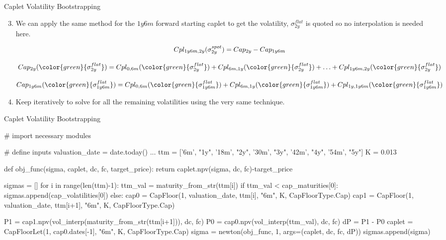 \documentclass{beamer}
\begin{document}
\begin{frame}{Caplet Volatility Bootstrapping}
\begin{enumerate}
\setcounter{enumi}{2}
\item We can apply the same method for the $1y6m$ forward starting caplet to get the volatility, $\sigma^{flat}_{2y}$ is quoted so no interpolation is needed here.

\begin{equation*}
	\begin{gathered}
		Cpl_{1y6m, 2y}(\sigma^{spot}_{2y})=Cap_{2y}-Cap_{1y6m} \\[0.3cm]
		Cap_{2y}(\color{green}{\sigma^{flat}_{2y}})=Cpl_{0,6m}(\color{green}{\sigma^{flat}_{2y}}) + Cpl_{6m,1y}(\color{green}{\sigma^{flat}_{2y}}) + \ldots + Cpl_{1y6m,2y}(\color{green}{\sigma^{flat}_{2y}}) \\[0.3cm]
		Cap_{1y6m}(\color{green}{\sigma^{flat}_{1y6m}})=Cpl_{0,6m}(\color{green}{\sigma^{flat}_{1y6m}}) + Cpl_{6m,1y}(\color{green}{\sigma^{flat}_{1y6m}}) + Cpl_{1y,1y6m}(\color{green}{\sigma^{flat}_{1y6m}})
	\end{gathered}
\end{equation*}

\item Keep iteratively to solve for all the remaining volatilities using the very same technique.
\end{enumerate}
\end{frame}

\begin{frame}[fragile]{Caplet Volatility Bootstrapping}
\begin{codebox}
	\begin{ipython}[linewidth=0.7\linewidth]
# import necessary modules

# define inputs
valuation_date = date.today()
...
ttm = ['6m', "1y", '18m', "2y", '30m', "3y", '42m', "4y", '54m', "5y"]
K = 0.013

def obj_func(sigma, caplet, dc, fc, target_price):
    return caplet.npv(sigma, dc, fc)-target_price

sigmas = []
for i in range(len(ttm)-1):
    ttm_val = maturity_from_str(ttm[i])
    if ttm_val < cap_maturities[0]:
        sigmas.append(cap_volatilities[0])
    else:
        cap0 = CapFloor(1, valuation_date, ttm[i], "6m", K, CapFloorType.Cap)
        cap1 = CapFloor(1, valuation_date, ttm[i+1], "6m", K, CapFloorType.Cap)

        P1 = cap1.npv(vol_interp(maturity_from_str(ttm[i+1])), dc, fc)
        P0 = cap0.npv(vol_interp(ttm_val), dc, fc)
        dP = P1 - P0
        caplet = CapFloorLet(1, cap0.dates[-1], "6m", K, CapFloorType.Cap)
        sigma = newton(obj_func, 1, args=(caplet, dc, fc, dP))
        sigmas.append(sigma)		
	\end{ipython}
	\end{codebox}
\end{frame}
\end{document}
